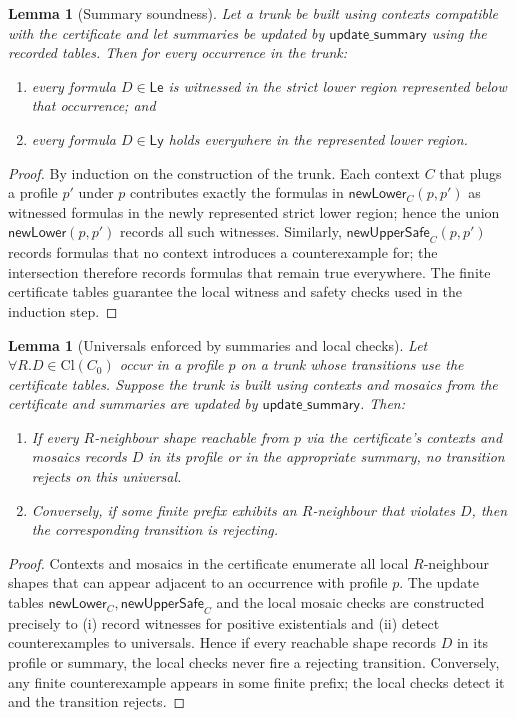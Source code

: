 \documentclass[11pt]{article}
\newcommand{\Cl}{\mathrm{Cl}}
\newtheorem{lemma}[theorem]{Lemma}
\begin{document}
\begin{lemma}[Summary soundness]
\label{lem:summary-soundness}
Let a trunk be built using contexts compatible with the certificate and let
summaries be updated by $\mathsf{update\_summary}$ using the recorded tables.
Then for every occurrence in the trunk:
\begin{enumerate}
  \item every formula $D\in\mathsf{Le}$ is witnessed in the strict lower region
    represented below that occurrence; and
  \item every formula $D\in\mathsf{Ly}$ holds everywhere in the represented
    lower region.
\end{enumerate}
\end{lemma}

\begin{proof}
By induction on the construction of the trunk. Each context $C$ that plugs a
profile $p'$ under $p$ contributes exactly the formulas in
$\mathsf{newLower}_C(p,p')$ as witnessed formulas in the newly represented
strict lower region; hence the union $\mathsf{newLower}(p,p')$ records all
such witnesses. Similarly, $\mathsf{newUpperSafe}_C(p,p')$ records formulas
that no context introduces a counterexample for; the intersection therefore
records formulas that remain true everywhere. The finite certificate tables
guarantee the local witness and safety checks used in the induction step.
\end{proof}

\begin{lemma}[Universals enforced by summaries and local checks]
\label{lem:universals-enforced}
Let $\forall R.D\in\Cl(C_0)$ occur in a profile $p$ on a trunk whose transitions
use the certificate tables. Suppose the trunk is built using contexts and
mosaics from the certificate and summaries are updated by
$\mathsf{update\_summary}$. Then:
\begin{enumerate}
  \item If every $R$-neighbour shape reachable from $p$ via the certificate's
    contexts and mosaics records $D$ in its profile or in the appropriate
    summary, no transition rejects on this universal.
  \item Conversely, if some finite prefix exhibits an $R$-neighbour that
    violates $D$, then the corresponding transition is rejecting.
\end{enumerate}
\end{lemma}

\begin{proof}
Contexts and mosaics in the certificate enumerate all local $R$-neighbour
shapes that can appear adjacent to an occurrence with profile $p$. The
update tables $\mathsf{newLower}_C,\mathsf{newUpperSafe}_C$ and the local
mosaic checks are constructed precisely to (i) record witnesses for positive
existentials and (ii) detect counterexamples to universals. Hence if every
reachable shape records $D$ in its profile or summary, the local checks never
fire a rejecting transition. Conversely, any finite counterexample appears in
some finite prefix; the local checks detect it and the transition rejects.
\end{proof}
\end{document}
